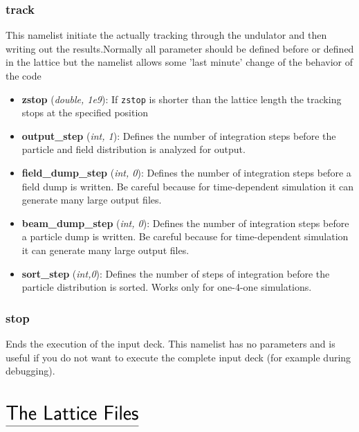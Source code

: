 \documentclass[12pt]{book}
\begin{document}
\subsection{\sf track}
This namelist initiate the actually tracking through the undulator and then writing out the results.Normally all parameter should be defined before or defined in the lattice but the namelist allows some 'last minute' change of the behavior of the code

\begin{itemize}
\item {\bf zstop} ({\it double, 1e9}): If {\tt zstop} is shorter than the lattice length the tracking stops at the specified position
\item {\bf output\_step} ({\it int, 1}): Defines the number of integration steps before the particle and field distribution is analyzed for output.
\item {\bf field\_dump\_step} ({\it int, 0}): Defines the number of integration steps before a field dump is written. Be careful because for time-dependent simulation it can generate many large output files.
\item {\bf beam\_dump\_step} ({\it int, 0}): Defines the number of integration steps before a particle dump is written. Be careful because for time-dependent simulation it can generate many large output files.
\item {\bf sort\_step} ({\it int,0}): Defines the number of steps of integration before the particle distribution is sorted. Works only for one-4-one simulations.

\end{itemize}


\subsection{\sf stop}
Ends the execution of the input deck. This namelist has no parameters and is useful if you do not want to execute the complete input deck (for example during debugging).


\chapter*{\vspace{-3cm}$\underline{\mbox{\rule[-0.5em]{0cm}{1em}\huge\sf The Lattice Files}}$}
\end{document}
